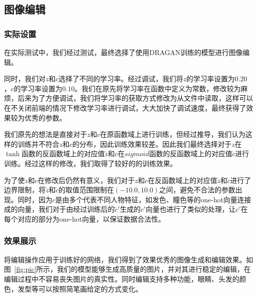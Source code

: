 \documentclass[a4paper,12pt,UTF8]{ctexart}
\begin{document}





\subsection{图像编辑}

\subsubsection{实际设置}

在实际测试中，我们经过测试，最终选择了使用DRAGAN训练的模型进行图像编辑。

同时，我们对$z$和$c$选择了不同的学习率。经过调试，我们将$z$的学习率设置为$0.20$，$c$的学习率设置为$0.10$。我们在原先将学习率在函数中定义为常数，修改较为麻烦，后来为了方便调试，我们将学习率的获取方式修改为从文件中读取，这样可以在不关闭前端的情况下修改学习率进行调试，大大加快了调试速度，最终获得了效果较为优秀的参数。

我们原先的想法是直接对于$z$和$c$在原函数域上进行训练，但经过推导，我们认为这样的训练并不符合$z$和$c$的分布，因此训练效果较差。因此我们最终选择对于$z$在$\tanh$函数的反函数域上的对应值$\tilde z$和$c$在$sigmoid$函数的反函数域上的对应值$\tilde c$进行训练。经过这样的修改，我们取得了较好的的训练效果。

为了使$z$和$c$在修改后仍然有意义，我们对于$z$和$c$在反函数域上的对应值$\tilde z$和$\tilde c$进行了边界限制，将$\tilde z$和$\tilde c$的取值范围限制在$(-10.0, 10.0)$之间，避免不合法的参数出现。同时，因为$c$是由多个代表不同人物特征，如发色、瞳色等的one-hot向量连接成的向量，我们对于由经过训练后的$\tilde c'$生成的$c'$向量也进行了类似的处理，让$c'$在每个对应的部分为one-hot向量，以保证数据合法性。

\subsubsection{效果展示}

将编辑操作应用于训练好的网络，我们得到了效果优秀的图像生成和编辑效果。如图~\ref{fig:pic}所示，我们的模型能够生成高质量的图片，并对其进行稳定的编辑，在编辑过程中不容易丧失图片的真实性。同时编辑支持多种功能，眼睛、头发的颜色，发型等可以按照简笔画给定的方式变化。
\end{document}
